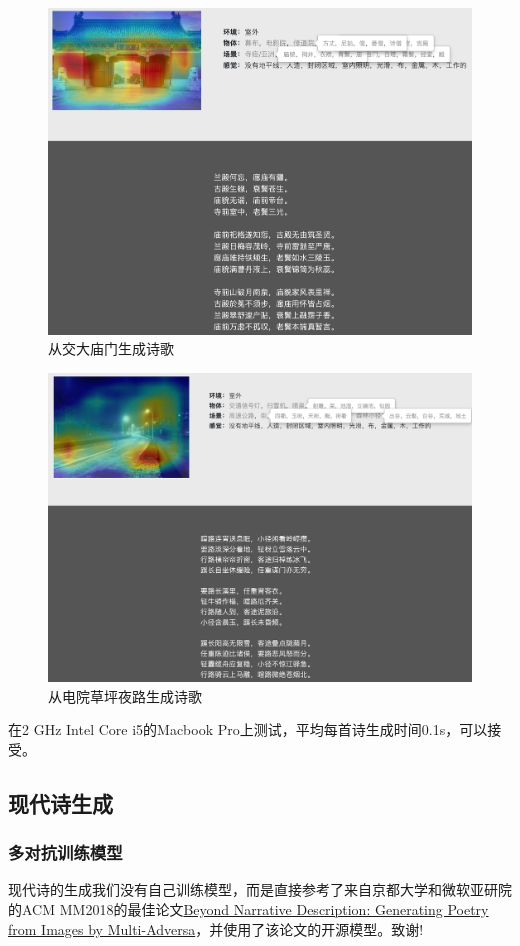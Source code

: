 \documentclass[a4paper, 10pt]{article}
\begin{document}
\begin{figure}[H]
\centering
\includegraphics[width=0.9\linewidth]{imgs/6.png}
\caption{从交大庙门生成诗歌}
\end{figure}
\begin{figure}[H]
\centering
\includegraphics[width=0.9\linewidth]{imgs/7.png}
\caption{从电院草坪夜路生成诗歌}
\end{figure}

在2 GHz Intel Core i5的Macbook Pro上测试，平均每首诗生成时间0.1s，可以接受。

\subsection{现代诗生成}
\subsubsection*{多对抗训练模型}
现代诗的生成我们没有自己训练模型，而是直接参考了来自京都大学和微软亚研院的ACM MM2018的最佳论文\href{https://arxiv.org/pdf/1804.08473.pdf}{Beyond Narrative Description: Generating Poetry from Images by Multi-Adversa}，并使用了该论文的开源模型。致谢!
\end{document}
